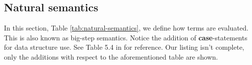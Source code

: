 \documentclass[a4paper]{article}
\begin{document}



\subsection{Natural semantics}

In this section, Table \ref{tab:natural-semantics}, we define how terms are
evaluated. This is also known as big-step semantics. Notice the addition of
\textbf{case}-statements for data structure use. See Table 5.4 in \cite{nnh}
for reference. Our listing isn't complete, only the additions with respect to the 
aforementioned table are shown. 
\end{document}

